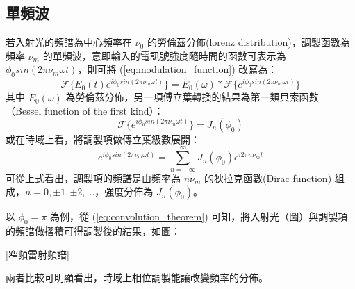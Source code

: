\documentclass[class=NCU_thesis, crop=false]{standalone}
\begin{document}
\subsection{單頻波}
若入射光的頻譜為中心頻率在 $\nu_{0}$ 的勞倫茲分佈(lorenz distribution)，調製函數為頻率 $\nu_{m}$ 的單頻波，意即輸入的電訊號強度隨時間的函數可表示為 $\phi_{0} sin(2\pi \nu_{m} \omega t)$，則可將 (\ref{eq:modulation_function}) 改寫為：
\begin{equation}
\label{eq:convolution_theorem}
    \mathscr{F}\{E_{0}(t)e^{i\phi_{0} sin(2\pi \nu_{m} \omega t)}\}=\tilde{E_{0}}(\omega)*\mathscr{F}\{{e^{i\phi_{0} sin(2\pi \nu_{m} \omega t)}}\}
\end{equation}
其中 $\tilde{E_{0}}(\omega)$ 為勞倫茲分佈，另一項傅立葉轉換的結果為第一類貝索函數 （Bessel function of the first kind）：
\begin{equation}
    \mathscr{F}\{{e^{i\phi_{0} sin(2\pi \nu_{m} \omega t)}}\}=J_{n}(\phi_{0})
\end{equation}
或在時域上看，將調製項做傅立葉級數展開：
\begin{equation}
    e^{i\phi_{0} sin(2\pi \nu_{m} \omega t)}=\sum_{n=-\infty}^{\infty}J_{n}(\phi_{0})e^{i 2 \pi n \nu_{m} t}
\end{equation}
可從上式看出，調製項的頻譜是由頻率為 $n \nu_{m}$ 的狄拉克函數(Dirac function) 組成，$n=0, \pm1, \pm2, ...$，強度分佈為 $J_{n}(\phi_{0})$。

以 $\phi_{0}=\pi$ 為例，從 (\ref{eq:convolution_theorem}) 可知，將入射光（圖）與調製項的頻譜做摺積可得調製後的結果，如圖：

[窄頻雷射頻譜]

兩者比較可明顯看出，時域上相位調製能讓改變頻率的分佈。
\end{document}
